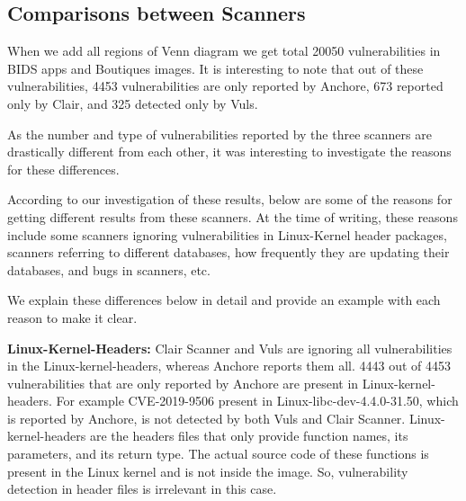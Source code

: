 \documentclass[a4paper,num-refs]{oup-contemporary}
\begin{document}
\subsection{Comparisons between Scanners}

When we add all regions of Venn diagram
we get total 20050 vulnerabilities in BIDS apps and Boutiques images.
It is interesting to note that out of these vulnerabilities, 4453 vulnerabilities are only
reported by Anchore, 673 reported only by Clair, and 325 detected only by Vuls.

As the number and type of vulnerabilities reported by the three scanners are drastically different from each other,
it was interesting to investigate the reasons for these differences.

According to our investigation of these results, below are some of the reasons for
getting different results from these scanners. At the time of writing, these reasons include
some scanners ignoring vulnerabilities in Linux-Kernel header packages, scanners referring to different databases,
how frequently they are updating their databases, and bugs in scanners, etc. 

We explain these differences below in detail
and provide an example with each reason to make it clear.

\textbf{Linux-Kernel-Headers:} Clair Scanner and Vuls are ignoring all vulnerabilities in the Linux-kernel-headers,
whereas Anchore reports them all.
4443 out of 4453 vulnerabilities that are only reported by Anchore are present in Linux-kernel-headers.
For example CVE-2019-9506 present in Linux-libc-dev-4.4.0-31.50, which is reported by Anchore, is not
detected by both Vuls and Clair Scanner.
Linux-kernel-headers are the headers files that only provide function names, its parameters, and its
return type.
The actual source code of these functions is present in the Linux kernel and is not inside the image.
So, vulnerability detection in header files
is irrelevant in this case.
\end{document}
